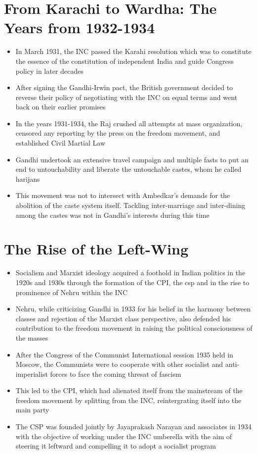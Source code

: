 \section{From Karachi to Wardha: The Years from 1932-1934}
\begin{itemize}
    \item In March 1931, the INC passed the Karahi resolution which was to constitute the essence of the constitution of independent India and guide Congress policy in later decades
    \item After signing the Gandhi-Irwin pact, the British government decided to reverse their policy of negotiating with the INC on equal terms and went back on their earlier promises
    \item In the years 1931-1934, the Raj crushed all attempts at mass organization, censored any reporting by the press on the freedom movement, and established Civil Martial Law
    \item Gandhi undertook an extensive travel campaign and multiple fasts to put an end to untouchability and liberate the untouchable castes, whom he called \Glspl{harijan}
    \item This movement was not to intersect with Ambedkar's demands for the abolition of the caste system itself. Tackling inter-marriage and inter-dining among the castes was not in Gandhi's interests during this time
\end{itemize}

\section{The Rise of the Left-Wing}
\begin{itemize}
    \item Socialism and Marxist ideology acquired a foothold in Indian politics in the 1920s and 1930s through the formation of the CPI, the \acrshort{csp} and in the rise to prominence of Nehru within the INC
    \item Nehru, while criticizing Gandhi in 1933 for his belief in the harmony between classes and rejection of the Marxist class perspective, also defended his contribution to the freedom movement in raising the political consciousness of the masses
    \item After the Congress of the Communist International session 1935 held in Moscow, the Communists were to cooperate with other socialist and anti-imperialist forces to face the coming thresat of fascism
    \item This led to the CPI, which had alienated itself from the mainstream of the freedom movement by splitting from the INC, reintergrating itself into the main party
    \item The CSP was founded jointly by Jayaprakash Narayan and associates in 1934 with the objective of working under the INC umberella with the aim of steering it leftward and compelling it to adopt a socialist program
\end{itemize}

